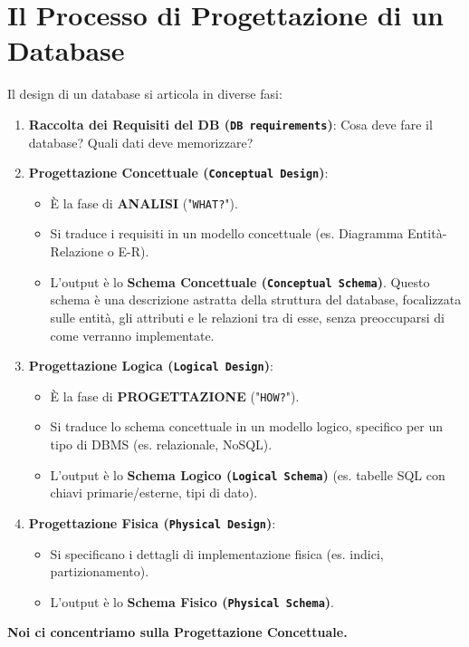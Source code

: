 	\section{Il Processo di Progettazione di un Database}
	Il design di un database si articola in diverse fasi:
	\begin{enumerate}
		\item \textbf{Raccolta dei Requisiti del DB (\texttt{DB requirements})}: Cosa deve fare il database? Quali dati deve memorizzare?
		\item \textbf{Progettazione Concettuale (\texttt{Conceptual Design})}:
		\begin{itemize}
			\item È la fase di \textbf{ANALISI} ("\texttt{WHAT?}").
			\item Si traduce i requisiti in un modello concettuale (es. Diagramma Entità-Relazione o E-R).
			\item L'output è lo \textbf{Schema Concettuale (\texttt{Conceptual Schema})}. Questo schema è una descrizione astratta della struttura del database, focalizzata sulle entità, gli attributi e le relazioni tra di esse, senza preoccuparsi di come verranno implementate.
		\end{itemize}
		\item \textbf{Progettazione Logica (\texttt{Logical Design})}:
		\begin{itemize}
			\item È la fase di \textbf{PROGETTAZIONE} ("\texttt{HOW?}").
			\item Si traduce lo schema concettuale in un modello logico, specifico per un tipo di DBMS (es. relazionale, NoSQL).
			\item L'output è lo \textbf{Schema Logico (\texttt{Logical Schema})} (es. tabelle SQL con chiavi primarie/esterne, tipi di dato).
		\end{itemize}
		\item \textbf{Progettazione Fisica (\texttt{Physical Design})}:
		\begin{itemize}
			\item Si specificano i dettagli di implementazione fisica (es. indici, partizionamento).
			\item L'output è lo \textbf{Schema Fisico (\texttt{Physical Schema})}.
		\end{itemize}
	\end{enumerate}
	\textbf{Noi ci concentriamo sulla Progettazione Concettuale.}
	
